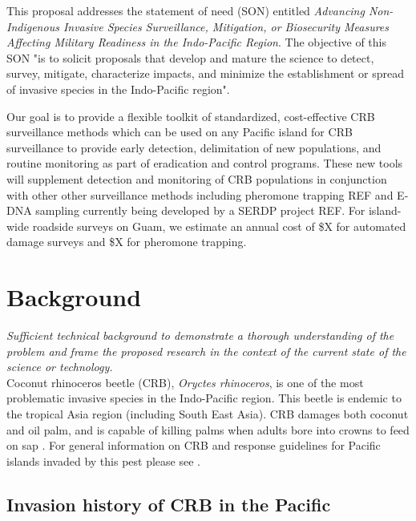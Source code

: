 \documentclass[11pt,english,letterpaper]{scrartcl}
\begin{document}
This proposal addresses the statement of need (SON) entitled \textit{Advancing Non-Indigenous Invasive Species Surveillance, Mitigation, or Biosecurity Measures Affecting Military Readiness in the Indo-Pacific Region}. The objective of this SON "is to solicit proposals that develop and mature the science to detect, survey, mitigate, characterize impacts, and minimize the establishment or spread of invasive species in the Indo-Pacific region".
	
Our goal is to provide a flexible toolkit of standardized, cost-effective CRB surveillance methods which can be used on any Pacific island for CRB surveillance to provide early detection, delimitation of new populations, and routine monitoring as part of eradication and control programs. These new tools will supplement detection and monitoring of CRB populations in conjunction with other other surveillance methods including pheromone trapping REF and E-DNA sampling currently being developed by a SERDP project REF. For island-wide roadside surveys on Guam, we estimate an annual cost of \$X for automated damage surveys and \$X for pheromone trapping. 

\section{Background}


\textit{Sufficient technical background to demonstrate a thorough understanding of the problem and frame the proposed research in the context of the current state of the science or technology.}\\

Coconut rhinoceros beetle (CRB), \textit{Oryctes rhinoceros}, is one of the most problematic invasive species in the Indo-Pacific region. This beetle is endemic to the tropical Asia region (including South East Asia). CRB damages both coconut and oil palm, and is capable of killing palms when adults bore into crowns to feed on sap \cite{Bedford2013a, Bedford2013b}. For general information on CRB and response guidelines for Pacific islands invaded by this pest please see \cite{Pallipparambil2015,Jackson2020,Moore2023}. 

\subsection{Invasion history of CRB in the Pacific}
\end{document}
